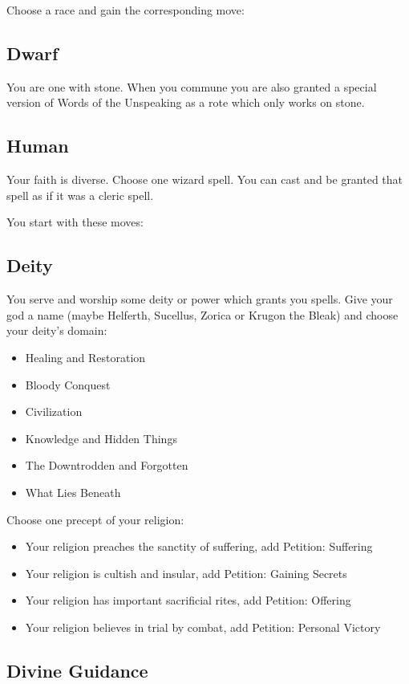  Choose a race and gain the corresponding move:
\subsection{Dwarf}


 You are one with stone. When you commune you are also granted a special version of Words of the Unspeaking as a rote which only works on stone.
\subsection{Human}


 Your faith is diverse. Choose one wizard spell. You can cast and be granted that spell as if it was a cleric spell.


 You start with these moves:
\subsection{Deity}


 You serve and worship some deity or power which grants you spells. Give your god a name (maybe Helferth, Sucellus, Zorica or Krugon the Bleak) and choose your deity's domain:
\begin{itemize}
\item Healing and Restoration
\item Bloody Conquest
\item Civilization
\item Knowledge and Hidden Things
\item The Downtrodden and Forgotten
\item What Lies Beneath

\end{itemize}


 Choose one precept of your religion:
\begin{itemize}
\item Your religion preaches the sanctity of suffering, add Petition: Suffering
\item Your religion is cultish and insular, add Petition: Gaining Secrets
\item Your religion has important sacrificial rites, add Petition: Offering
\item Your religion believes in trial by combat, add Petition: Personal Victory

\end{itemize}
\subsection{Divine Guidance}


